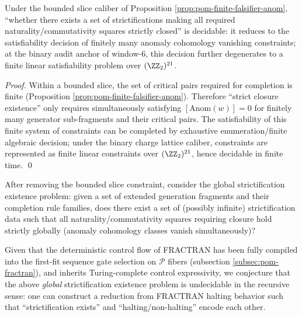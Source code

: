 \begin{corollary}\label{cor:pom-strictification-existence-decidable-bounded-slice}
Under the bounded slice caliber of Proposition \ref{prop:pom-finite-falsifier-anom}, ``whether there exists a set of strictifications making all required naturality/commutativity squares strictly closed'' is decidable: it reduces to the satisfiability decision of finitely many anomaly cohomology vanishing constraints;
at the binary audit anchor of window-\(6\), this decision further degenerates to a finite linear satisfiability problem over \((\ZZ_2)^{21}\).
\end{corollary}
\begin{proof}
Within a bounded slice, the set of critical pairs required for completion is finite (Proposition \ref{prop:pom-finite-falsifier-anom}).
Therefore ``strict closure existence'' only requires simultaneously satisfying \([\mathrm{Anom}(w)]=0\) for finitely many generator sub-fragments and their critical pairs.
The satisfiability of this finite system of constraints can be completed by exhaustive enumeration/finite algebraic decision; under the binary charge lattice caliber, constraints are represented as finite linear constraints over \((\ZZ_2)^{21}\), hence decidable in finite time. \qed
\end{proof}

\begin{conjecture}\label{conj:pom-global-strictification-undecidable}
After removing the bounded slice constraint, consider the global strictification existence problem: given a set of extended generation fragments and their completion rule families, does there exist a set of (possibly infinite) strictification data such that all naturality/commutativity squares requiring closure hold strictly globally (anomaly cohomology classes vanish simultaneously)?
\par
Given that the deterministic control flow of FRACTRAN has been fully compiled into the first-fit sequence gate selection on \(\mathcal{P}\) fibers (subsection \ref{subsec:pom-fractran}), and inherits Turing-complete control expressivity, we conjecture that the above \emph{global} strictification existence problem is undecidable in the recursive sense: one can construct a reduction from FRACTRAN halting behavior such that ``strictification exists'' and ``halting/non-halting'' encode each other.
\end{conjecture}

